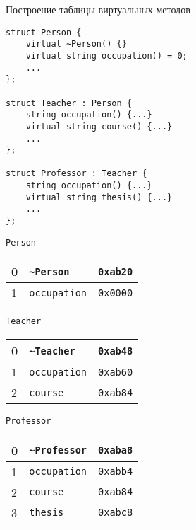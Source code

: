 \documentclass{beamer}
\begin{document}
\begin{frame}[fragile]{Построение таблицы виртуальных методов}
    \begin{minipage}{.58\textwidth}
        \begin{lstlisting}[basicstyle=\fontsize{8pt}{1em}\ttfamily]
struct Person {
    virtual ~Person() {}
    virtual string occupation() = 0;
    ...
};

struct Teacher : Person {
    string occupation() {...}
    virtual string course() {...}
    ...
};

struct Professor : Teacher {
    string occupation() {...}
    virtual string thesis() {...}
    ...
};
    \end{lstlisting}
\end{minipage}\hspace{2mm}
\begin{minipage}{3cm}
    {\tt Person}
    \begin{tabular}{|l|l|l|}
        \hline
        0 & \texttt{\textasciitilde{}Person}  & \texttt{0xab20} \\\hline
        1 & \texttt{occupation}                & \texttt{0x0000} \\\hline
    \end{tabular}
    \vspace{1em}

    {\tt Teacher}
    \begin{tabular}{|l|l|l|}
        \hline
        0 & \texttt{\textasciitilde{}Teacher} & \texttt{0xab48} \\\hline
        1 & \texttt{occupation}                & \texttt{0xab60} \\\hline
        2 & \texttt{course}                   & \texttt{0xab84}  \\\hline
    \end{tabular}
    \vspace{1em}

    {\tt Professor}
    \begin{tabular}{|l|l|l|}
        \hline
        0 & \texttt{\textasciitilde{}Professor} & \texttt{0xaba8} \\\hline
        1 & \texttt{occupation}& \texttt{0xabb4} \\\hline
        2 & \texttt{course}   & \texttt{0xab84} \\\hline
        3 & \texttt{thesis}   & \texttt{0xabc8} \\\hline
    \end{tabular}
\end{minipage}
\end{frame}
\end{document}
